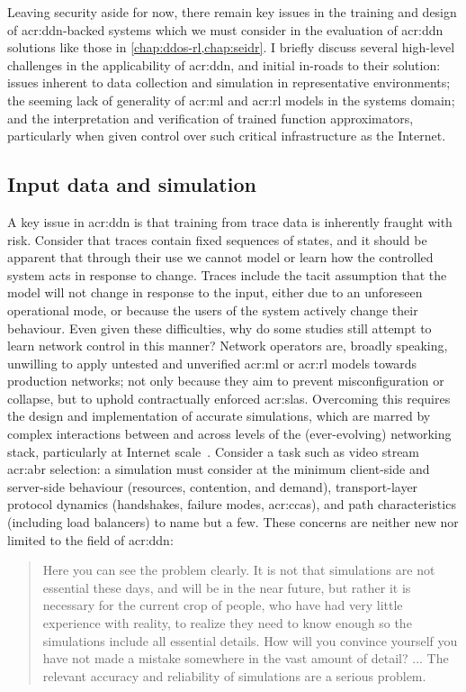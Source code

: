 Leaving security aside for now, there remain key issues in the training and design of \gls{acr:ddn}-backed systems which we must consider in the evaluation of \gls{acr:ddn} solutions like those in \cref{chap:ddos-rl,chap:seidr}.
I briefly discuss several high-level challenges in the applicability of \gls{acr:ddn}, and initial in-roads to their solution: issues inherent to data collection and simulation in representative environments; the seeming lack of generality of \gls{acr:ml} and \gls{acr:rl} models in the systems domain; and the interpretation and verification of trained function approximators, particularly when given control over such critical infrastructure as the Internet.

\subsection{Input data and simulation}
A key issue in \gls{acr:ddn} is that training from trace data is inherently fraught with risk.
Consider that traces contain fixed sequences of states, and it should be apparent that through their use we cannot model or learn how the controlled system acts in response to change.
Traces include the tacit assumption that the model will not change in response to the input, either due to an unforeseen operational mode, or because the users of the system actively change their behaviour.
Even given these difficulties, why do some studies still attempt to learn network control in this manner?
Network operators are, broadly speaking, unwilling to apply untested and unverified \gls{acr:ml} or \gls{acr:rl} models towards production networks; not only because they aim to prevent misconfiguration or collapse, but to uphold contractually enforced \glspl{acr:sla}.
Overcoming this requires the design and implementation of accurate simulations, which are marred by complex interactions between and across levels of the (ever-evolving) networking stack, particularly at Internet scale~\parencite{DBLP:journals/ton/X01c}.
Consider a task such as video stream \gls{acr:abr} selection: a simulation must consider at the minimum client-side and server-side behaviour (resources, contention, and demand), transport-layer protocol dynamics (handshakes, failure modes, \glspl{acr:cca}), and path characteristics (including load balancers) to name but a few.
These concerns are neither new nor limited to the field of \gls{acr:ddn}:
\begin{quotation}
\noindent
Here you can see the problem clearly.
It is not that simulations are not essential these days, and will be in the near future, but rather it is necessary for the current crop of people, who have had very little experience with reality, to realize they need to know enough so the simulations include all essential details.
How will you convince yourself you have not made a mistake somewhere in the vast amount of detail?
... The relevant accuracy and reliability of simulations are a serious problem.\\
\strut\hfill\parencite[p. 248]{hamming-art-of-scieng} 
\end{quotation}
